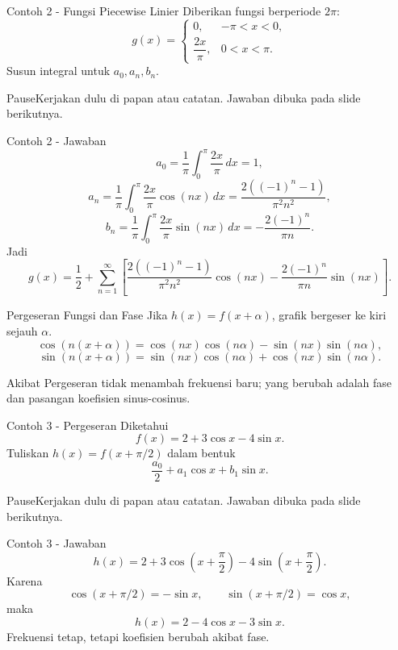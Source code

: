 \documentclass[aspectratio=169,10pt]{beamer}
\newcommand{\pauseboard}{\begin{alertblock}{Pause}Kerjakan dulu di papan atau catatan. Jawaban dibuka pada slide berikutnya.\end{alertblock}}
\begin{document}
\begin{frame}{Contoh 2 - Fungsi Piecewise Linier}
Diberikan fungsi berperiode $2\pi$:
\[
g(x)=
\begin{cases}
0,&-\pi<x<0,\\
\dfrac{2x}{\pi},&0<x<\pi.
\end{cases}
\]
Susun integral untuk $a_0,a_n,b_n$.
\pauseboard
\end{frame}


\begin{frame}{Contoh 2 - Jawaban}
\[
a_0=\frac1\pi\int_0^\pi\frac{2x}{\pi}\,dx=1,
\]
\[
a_n=\frac1\pi\int_0^\pi\frac{2x}{\pi}\cos(nx)\,dx
=\frac{2\left((-1)^n-1\right)}{\pi^2n^2},
\]
\[
b_n=\frac1\pi\int_0^\pi\frac{2x}{\pi}\sin(nx)\,dx
=-\frac{2(-1)^n}{\pi n}.
\]
Jadi
\[
g(x)=\frac12+\sum_{n=1}^{\infty}\left[
\frac{2\left((-1)^n-1\right)}{\pi^2n^2}\cos(nx)
-\frac{2(-1)^n}{\pi n}\sin(nx)\right].
\]
\end{frame}


\begin{frame}{Pergeseran Fungsi dan Fase}
Jika $h(x)=f(x+\alpha)$, grafik bergeser ke kiri sejauh $\alpha$.
\[
\cos(n(x+\alpha))=\cos(nx)\cos(n\alpha)-\sin(nx)\sin(n\alpha),
\]
\[
\sin(n(x+\alpha))=\sin(nx)\cos(n\alpha)+\cos(nx)\sin(n\alpha).
\]
\begin{block}{Akibat}
Pergeseran tidak menambah frekuensi baru; yang berubah adalah fase dan pasangan koefisien sinus-cosinus.
\end{block}
\end{frame}


\begin{frame}{Contoh 3 - Pergeseran}
Diketahui
\[
f(x)=2+3\cos x-4\sin x.
\]
Tuliskan $h(x)=f(x+\pi/2)$ dalam bentuk
\[
\frac{a_0}{2}+a_1\cos x+b_1\sin x.
\]
\pauseboard
\end{frame}


\begin{frame}{Contoh 3 - Jawaban}
\[
h(x)=2+3\cos\left(x+\frac\pi2\right)
-4\sin\left(x+\frac\pi2\right).
\]
Karena
\[
\cos(x+\pi/2)=-\sin x,\qquad
\sin(x+\pi/2)=\cos x,
\]
maka
\[
\boxed{h(x)=2-4\cos x-3\sin x.}
\]
Frekuensi tetap, tetapi koefisien berubah akibat fase.
\end{frame}
\end{document}
